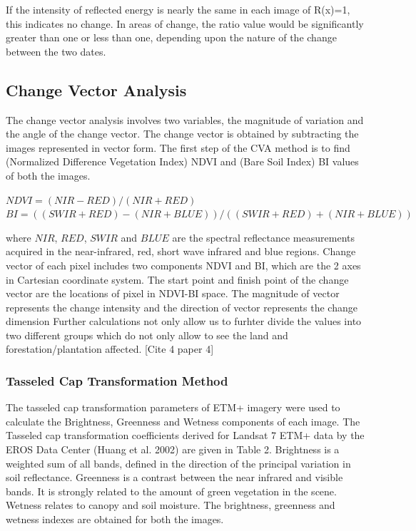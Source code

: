 \documentclass[12pt,a4paper,IEEEtran]{article}
\begin{document}
If the intensity of reflected energy is nearly the same in each image of R(x)=1, this indicates no change. In areas of change, the ratio value would be significantly greater than one or less than one, depending upon the nature of the change between the two dates. 


\subsection[3.4]{Change Vector Analysis}
The change vector analysis involves two variables, the magnitude of variation and the angle of the change vector.
The change vector is obtained by subtracting the images represented in vector form.
The first step of the CVA method is to find (Normalized Difference Vegetation Index) NDVI and (Bare Soil Index) BI values of both the images.

$NDVI = (NIR - RED) / (NIR + RED)$
\newline $BI = ((SWIR + RED) - (NIR + BLUE)) / ((SWIR + RED) + (NIR + BLUE))$

where $NIR$, $RED$, $SWIR$ and $BLUE$ are the spectral reflectance measurements acquired in the near-infrared, red, short wave infrared and blue regions.
Change vector of each pixel includes two components NDVI and BI, which are the 2 axes in Cartesian coordinate system. The start point and finish point of the change vector are the locations of pixel in NDVI-BI space. The magnitude of vector represents the change intensity and the direction of vector represents the change dimension 
Further calculations not only allow us to furhter divide the values into two different groups which do not only allow to see the land and forestation/plantation affected. [Cite 4 paper 4]

\subsubsection[3.4.1]{Tasseled Cap Transformation Method}
The tasseled cap transformation parameters of ETM+ imagery were used to calculate the Brightness, Greenness 
and Wetness components of each image. The Tasseled cap transformation coefficients derived for Landsat 7 ETM+ 
data by the EROS Data Center (Huang et al. 2002) are given in Table 2. Brightness is a weighted sum of all bands, 
defined in the direction of the principal variation in soil reflectance. Greenness is a contrast between the near infrared and visible bands. It is strongly related to the amount of green vegetation in the scene. Wetness relates to 
canopy and soil moisture. The brightness, greenness and wetness indexes are obtained for both the images.
\end{document}
